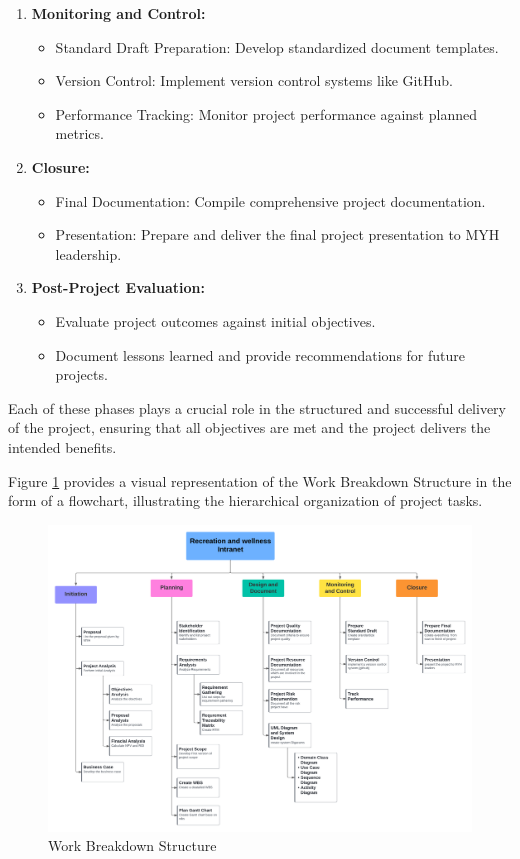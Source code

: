 \begin{enumerate}
    \item \textbf{Monitoring and Control:}
        \begin{itemize}
            \item Standard Draft Preparation: Develop standardized document templates.
            \item Version Control: Implement version control systems like GitHub.
            \item Performance Tracking: Monitor project performance against planned metrics.
        \end{itemize}

    \item \textbf{Closure:}
        \begin{itemize}
            \item Final Documentation: Compile comprehensive project documentation.
            \item Presentation: Prepare and deliver the final project presentation to MYH leadership.
        \end{itemize}

    \item \textbf{Post-Project Evaluation:}
        \begin{itemize}
            \item Evaluate project outcomes against initial objectives.
            \item Document lessons learned and provide recommendations for future projects.
        \end{itemize}
\end{enumerate}

Each of these phases plays a crucial role in the structured and successful delivery of the project, ensuring that all objectives are met and the project delivers the intended benefits.

Figure \ref{fig:wbs} provides a visual representation of the Work Breakdown Structure in the form of a flowchart, illustrating the hierarchical organization of project tasks.

\begin{figure}[ht]
    \includegraphics[width=\textwidth]{images/wbs.png}
    \caption{Work Breakdown Structure}
    \label{fig:wbs}
\end{figure}


